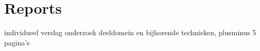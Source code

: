 \section{Reports}
individueel verslag onderzoek deeldomein en bijhorende technieken, plusminus 5 pagina's


